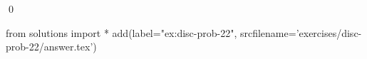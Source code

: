 
\begin{ex} 
  \label{ex:disc-prob-22}
  
  \qed
\end{ex} 
\begin{python0}
from solutions import *
add(label="ex:disc-prob-22",
    srcfilename='exercises/disc-prob-22/answer.tex') 
\end{python0}
